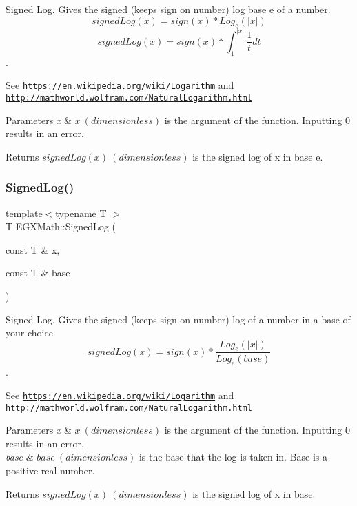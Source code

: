 Signed Log. Gives the signed (keeps sign on number) log base e of a number. \[signedLog(x)= sign(x)*Log_e(|x|)\] \[signedLog(x)= sign(x)*\int_{1}^{|x|}\frac{1}{t} dt\]. 

See \href{https://en.wikipedia.org/wiki/Logarithm}{\tt https\+://en.\+wikipedia.\+org/wiki/\+Logarithm} and \href{http://mathworld.wolfram.com/NaturalLogarithm.html}{\tt http\+://mathworld.\+wolfram.\+com/\+Natural\+Logarithm.\+html} 
\begin{DoxyParams}{Parameters}
{\em x} & $x\ (dimensionless)$ is the argument of the function. Inputting 0 results in an error. \\
\hline
\end{DoxyParams}
\begin{DoxyReturn}{Returns}
$signedLog(x)\ (dimensionless)$ is the signed log of x in base e. 
\end{DoxyReturn}
\mbox{\label{group___e_g_x_math-_functions-_log_ga4cd6a087fb1977d52a321bfad0dae0f6}} 
\subsubsection{\texorpdfstring{Signed\+Log()}{SignedLog()}\hspace{0.1cm}{\footnotesize\ttfamily [2/2]}}
{\footnotesize\ttfamily template$<$typename T $>$ \\
T E\+G\+X\+Math\+::\+Signed\+Log (\begin{DoxyParamCaption}\item[{const T \&}]{x,  }\item[{const T \&}]{base }\end{DoxyParamCaption})}



Signed Log. Gives the signed (keeps sign on number) log of a number in a base of your choice. \[signedLog(x)= sign(x)*\frac{Log_e(|x|)}{Log_e(base)}\]. 

See \href{https://en.wikipedia.org/wiki/Logarithm}{\tt https\+://en.\+wikipedia.\+org/wiki/\+Logarithm} and \href{http://mathworld.wolfram.com/NaturalLogarithm.html}{\tt http\+://mathworld.\+wolfram.\+com/\+Natural\+Logarithm.\+html} 
\begin{DoxyParams}{Parameters}
{\em x} & $x\ (dimensionless)$ is the argument of the function. Inputting 0 results in an error. \\
\hline
{\em base} & $base\ (dimensionless)$ is the base that the log is taken in. Base is a positive real number. \\
\hline
\end{DoxyParams}
\begin{DoxyReturn}{Returns}
$signedLog(x)\ (dimensionless)$ is the signed log of x in base. 
\end{DoxyReturn}
